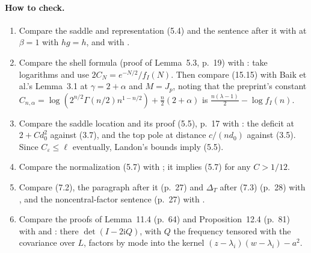 \documentclass[11pt]{article}
\newcommand{\ploc}[2]{#1}
\newcommand{\sloc}[2]{\cite[#2]{#1}}
\begin{document}
\paragraph{How to check.}
\begin{enumerate}
\item Compare the saddle and representation
\ploc{(5.4) and the sentence after it}{profile-spectral.tex:367--377} with
\sloc{BaikEtAl2020-SphericalSpinGlassExternalField}{Lemma~3.1, p.~11; eq.~(5.3), p.~17}
at $\beta=1$ with $hg=h$, and with
\sloc{DuHuang2026-CriticalSKOverlapDistribution}{eq.~(1.7), pp.~4--5}.
\item Compare the shell formula
\ploc{(proof of Lemma~5.3, p.~19)}{profile-spectral.tex:528--535} with
\sloc{DuHuang2026-CriticalSKFreeEnergyFluctuations}{Lemma~4.2, p.~18; proof of Prop.~4.4, p.~22}:
take logarithms and use $2C_N=e^{-N/2}/f_I(N)$. Then compare
\ploc{(15.15)}{cap-static.tex:587--589} with Baik et al.'s Lemma~3.1 at
$\gamma=2+\alpha$ and $M=J_p$, noting that the preprint's constant
$C_{n,\alpha}=\log(2^{n/2}\Gamma(n/2)n^{1-n/2})+\frac n2(2+\alpha)$ is
$\frac{n(\lambda-1)}2-\log f_I(n)$.
\item Compare the saddle location and its proof
\ploc{(5.5), p.~17}{profile-spectral.tex:379--386} with
\sloc{Landon2020-CriticalSphericalSKFreeEnergy}{Prop.~3.1 with (3.5) and (3.7), p.~9; Lemma~3.4, p.~10}:
the deficit at $2+Cd_0^2$ against (3.7), and the top pole at distance
$c/(nd_0)$ against (3.5). Since $C_\varepsilon\le\ell$ eventually, Landon's
bounds imply (5.5).
\item Compare the normalization \ploc{(5.7)}{profile-spectral.tex:520--561}
with \sloc{Landon2020-CriticalSphericalSKFreeEnergy}{Thm.~1.1, p.~2; eqs.~(1.3), (2.3)--(2.5)};
it implies (5.7) for any $C>1/12$.
\item Compare \ploc{(7.2), the paragraph after it (p.~27) and $\Delta_T$
after (7.3) (p.~28)}{profile-spectral.tex:1183--1213, 1251--1253} with
\sloc{DuHuang2026-CriticalSKFreeEnergyFluctuations}{proof of Prop.~4.5, pp.~23--24},
and the noncentral-factor sentence \ploc{(p.~27)}{profile-spectral.tex:1209--1210} with
\sloc{BaikEtAl2020-SphericalSpinGlassExternalField}{eq.~(3.5), p.~12; App.~A, p.~71}.
\item Compare the proofs of \ploc{Lemma~11.4 (p.~64)}{profile-local.tex:1078--1123}
and \ploc{Proposition~12.4 (p.~81)}{profile-amplification.tex:1265--1272} with
\sloc{DuHuang2026-CriticalSKFreeEnergyFluctuations}{Lemma~4.3, p.~19} and
\sloc{NguyenSosoe2018-OverlapCLTNearCriticalSphericalSK}{eqs.~(3.8)--(3.10), p.~7}:
there $\det(I-2\mathrm iQ)$, with $Q$ the frequency tensored with the
covariance over $L$, factors by mode into the kernel
$(z-\lambda_i)(w-\lambda_i)-a^2$.
\end{enumerate}
\end{document}

